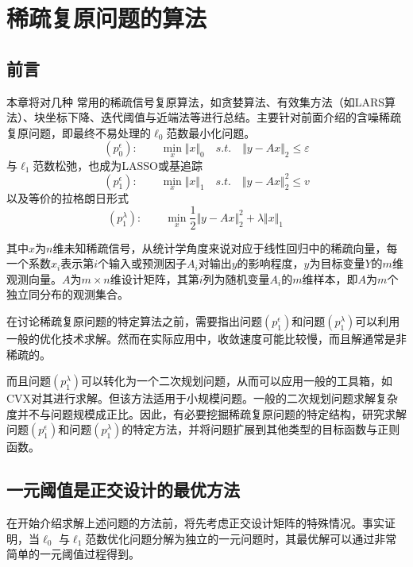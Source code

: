 \chapter{稀疏复原问题的算法}\label{chap:srt03:algorithms}

\section{前言}
 
本章将对几种 常用的稀疏信号复原算法，如贪婪算法、有效集方法（如LARS算法）、块坐标下降、迭代阈值与近端法等进行总结。主要针对前面介绍的含噪稀疏复原问题，即最终不易处理的$ \ell_0 $范数最小化问题。
\begin{equation}\label{key}
(p_{0}^{\epsilon}):\qquad \min_{x}\Vert x\Vert_0\quad s.t.\quad\Vert y-Ax\Vert_2\leq \varepsilon
\end{equation}
与$ \ell_1 $范数松弛，也成为LASSO或基追踪
\begin{equation*}\label{key}
(p_{1}^{\epsilon}):\qquad \min_{x}\Vert x\Vert_1\quad s.t.\quad\Vert y-Ax\Vert_2^2\leq v
\end{equation*}
以及等价的拉格朗日形式
\begin{equation}\label{key}
(p_{1}^{\lambda}):\qquad \min_{x} \dfrac{1}{2}\Vert y-Ax\Vert_2^2 + \lambda \Vert x\Vert_1 \qquad
\end{equation}

其中$ x $为$ n $维未知稀疏信号，从统计学角度来说对应于线性回归中的稀疏向量，每一个系数$ x_i $表示第$ i $个输入或预测因子$ A_i $对输出$ y $的影响程度，$ y $为目标变量$ Y $的$ m $维观测向量。$ A $为$ m\times n $维设计矩阵，其第$ i $列为随机变量$ A_i $的$ m $维样本，即$ A $为$ m $个独立同分布的观测集合。


在讨论稀疏复原问题的特定算法之前，需要指出问题$(p_{1}^{\epsilon})  $和问题$ (p_{1}^{\lambda}) $可以利用一般的优化技术求解。然而在实际应用中，收敛速度可能比较慢，而且解通常是非稀疏的。

而且问题$ (p_{1}^{\lambda}) $可以转化为一个二次规划问题，从而可以应用一般的工具箱，如CVX对其进行求解。但该方法适用于小规模问题。一般的二次规划问题求解复杂度并不与问题规模成正比。因此，{\heiti 有必要挖掘稀疏复原问题的特定结构，研究求解问题$(p_{1}^{\epsilon})  $和问题$ (p_{1}^{\lambda}) $的特定方法，并将问题扩展到其他类型的目标函数与正则函数。}

\section{一元阈值是正交设计的最优方法}
在开始介绍求解上述问题的方法前，将先考虑正交设计矩阵的特殊情况。事实证明，当$\ell_0$ 与$\ell_1$范数优化问题分解为独立的一元问题时，其最优解可以通过非常简单的一元阈值过程得到。

